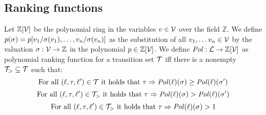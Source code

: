 \subsection{Ranking functions}

\begin{definition} 
	Let $\mathbb{Z}[\mathcal{V}]$ be the polynomial ring in the variables $v \in \mathcal{V}$ over the field $\mathbb{Z}$.
	We define $p(\sigma) = p[v_1/\sigma(v_1), \dots, v_n/\sigma(v_n)]$ as the substitution of all $v_1, \dots v_n \in \mathcal{V}$ by the valuation $\sigma: \mathcal{V} \rightarrow \mathbb{Z}$ in the polynomial $p \in \mathbb{Z}[\mathcal{V}]$.
	We define $\mathit{Pol}: \mathcal{L} \rightarrow \mathbb{Z}[\mathcal{V}]$ as polynomial ranking function for a transition set $\mathcal{T}$ iff there is a nonempty $\mathcal{T}_{>} \subseteq \mathcal{T}$ such that:
	\[ \text{For all } (\ell, \tau, \ell') \in \mathcal{T} \text{ it holds that } \tau \Rightarrow \mathit{Pol}(\ell)(\sigma) \geq \mathit{Pol}(\ell)(\sigma') \]
	\[ \text{For all } (\ell, \tau, \ell') \in \mathcal{T}_{>} \text{ it holds that } \tau \Rightarrow \mathit{Pol}(\ell)(\sigma) > \mathit{Pol}(\ell)(\sigma') \]
	\[ \text{For all } (\ell, \tau, \ell') \in \mathcal{T}_{>} \text{ it holds that } \tau \Rightarrow \mathit{Pol}(\ell)(\sigma) > 1 \]
\end{definition}
